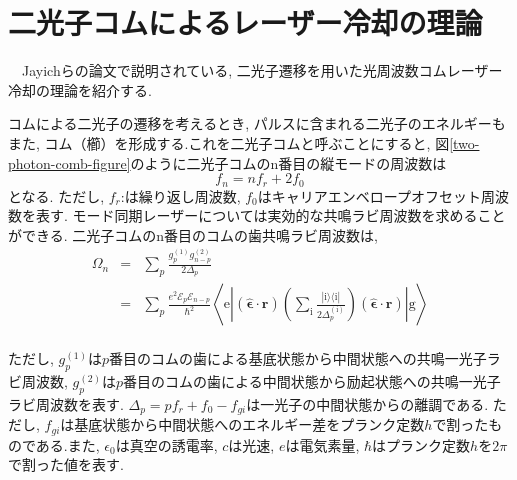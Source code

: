 \documentclass[uplatex, dvipdfmx, a4paper, report, papersize, 11pt]{jsbook}
\begin{document}
\section{二光子コムによるレーザー冷却の理論}
　Jayichらの論文\cite{PhysRevX.6.041004}で説明されている, 二光子遷移を用いた光周波数コムレーザー冷却の理論を紹介する.\par
コムによる二光子の遷移を考えるとき, パルスに含まれる二光子のエネルギーもまた, コム（櫛）を形成する.これを二光子コムと呼ぶことにすると, 図\ref{two-photon-comb-figure}のように二光子コムのn番目の縦モードの周波数は
\begin{equation}
f_n = nf_r + 2f_0
\end{equation}
となる. ただし, $f_r$:は繰り返し周波数, $f_0$はキャリアエンベロープオフセット周波数を表す. モード同期レーザーについては実効的な共鳴ラビ周波数を求めることができる. 二光子コムのn番目のコムの歯共鳴ラビ周波数は,
\begin{eqnarray}\label{ResonanceRabi}
\Omega _{n} &=&\sum _{p}\frac {g^{\left( 1\right) }_{p}g^{\left( 2\right) }_{n-p}}{2\Delta_p} \nonumber\\
&=& \sum _ { p } \frac { e ^ { 2 } \mathcal { E } _ { p } \mathcal { E } _ { n - p } } { \hbar ^ { 2 } } \left\langle \mathrm { e } \left| ( \hat { \boldsymbol { \epsilon } } \cdot \mathbf { r } ) \left( \sum _ { \mathrm { i } } \frac { | \mathrm { i } \rangle \langle \mathrm { i } | } { 2 \Delta _ { p } ^ { ( \mathrm { i } ) } } \right) ( \hat { \boldsymbol { \epsilon } } \cdot \mathbf { r } ) \right| \mathrm { g } \right\rangle
\end{eqnarray}\\
ただし, $g^{\left( 1\right) }_{p}$は$p$番目のコムの歯による基底状態から中間状態への共鳴一光子ラビ周波数, $g^{\left( 2\right) }_{p}$は$p$番目のコムの歯による中間状態から励起状態への共鳴一光子ラビ周波数を表す.
$\Delta _{p}=pf_{r}+f_{0}-f_{gi}$は一光子の中間状態からの離調である. ただし, $f_{gi}$は基底状態から中間状態へのエネルギー差をプランク定数$h$で割ったものである.また, $\epsilon_0$は真空の誘電率, $c$は光速, $e$は電気素量, $\hbar$はプランク定数$h$を$2\pi$で割った値を表す. \\
\end{document}
